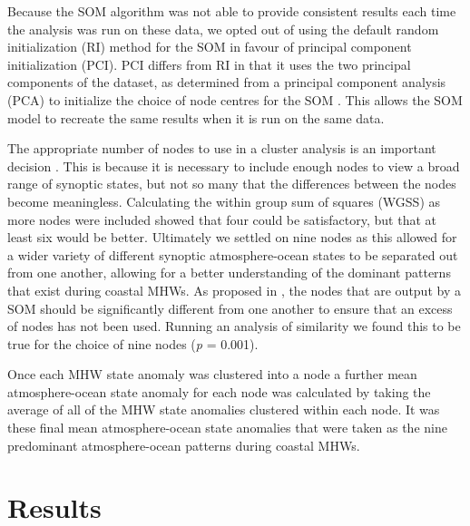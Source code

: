 \documentclass[utf8]{frontiersSCNS}
\begin{document}
Because the SOM algorithm was not able to provide consistent results each time the analysis was run on these data, we opted out of using the default random initialization (RI) method for the SOM in favour of principal component initialization (PCI). PCI differs from RI in that it uses the two principal components of the dataset, as determined from a principal component analysis (PCA) to initialize the choice of node centres for the SOM \citep{Akinduko2016}. This allows the SOM model to recreate the same results when it is run on the same data.

The appropriate number of nodes to use in a cluster analysis is an important decision \citep{Gibson2016a}. This is because it is necessary to include enough nodes to view a broad range of synoptic states, but not so many that the differences between the nodes become meaningless. Calculating the within group sum of squares (WGSS) as more nodes were included showed that four could be satisfactory, but that at least six would be better. Ultimately we settled on nine nodes as this allowed for a wider variety of different synoptic atmosphere-ocean states to be separated out from one another, allowing for a better understanding of the dominant patterns that exist during coastal MHWs. As proposed in \citet{Johnson2013}, the nodes that are output by a SOM should be significantly different from one another to ensure that an excess of nodes has not been used. Running an analysis of similarity we found this to be true for the choice of nine nodes (\emph{p} = 0.001).


Once each MHW state anomaly was clustered into a node a further mean atmosphere-ocean state anomaly for each node was calculated by taking the average of all of the MHW state anomalies clustered within each node. It was these final mean atmosphere-ocean state anomalies that were taken as the nine predominant atmosphere-ocean patterns during coastal MHWs.

\section{Results}
\end{document}
